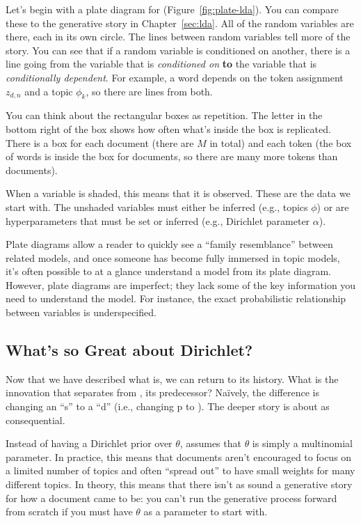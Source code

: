 Let's begin with a plate diagram for 
(Figure~\ref{fig:plate-lda}).  You can compare these to the generative
story in Chapter~\ref{sec:lda}.  All of the random variables are
there, each in its own circle.  The lines between random variables
tell more of the story.  You can see that if a random variable is
conditioned on another, there is a line going from the variable that
is \emph{conditioned on} {\bf to} the variable that is
\emph{conditionally dependent}.  For example, a word depends on the
token assignment $z_{d,n}$ and a topic $\phi_k$, so there are lines
from both.

You can think about the rectangular boxes as repetition.  The letter
in the bottom right of the box shows how often what's inside the box
is replicated.  There is a box for each document (there are $M$ in
total) and each token (the box of words is inside the box for
documents, so there are many more tokens than documents).

When a variable is shaded, this means that it is observed.  These are
the data we start with.  The unshaded variables must either be
inferred (e.g., topics $\phi$) or are hyperparameters that must be set
or inferred (e.g., Dirichlet parameter $\alpha$).

Plate diagrams allow a reader to quickly see a ``family resemblance''
between related models, and once someone has become fully immersed in
topic models, it's often possible to at a glance understand a model
from its plate diagram.  However, plate diagrams are imperfect; they
lack some of the key information you need to understand the model.
For instance, the exact probabilistic relationship between variables
is underspecified.

\subsection{What's so Great about Dirichlet?}
\label{sec:plsa-vs-lda}

Now that we have described what  is, we can return to its
history.  What is the innovation that separates  from
\plsa{}, its predecessor?  Na\"ively, the difference is changing an
``s'' to a ``d'' (i.e., changing p to ).  The deeper story is about as consequential.

Instead of having a Dirichlet prior over $\theta$, \plsa{} assumes
that $\theta$ is simply a multinomial parameter.  In practice, this
means that documents aren't encouraged to focus on a limited number of
topics and often ``spread out'' to have small weights for many
different topics.  In theory, this means that there isn't as sound a
generative story for how a document came to be: you can't run the
generative process forward from scratch if you must have $\theta$ as a
parameter to start with.

